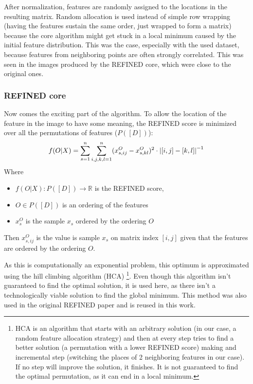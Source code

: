After normalization, features are randomly assigned to the locations in the resulting matrix. Random allocation is used instead of simple row wrapping (having the features sustain the same order, just wrapped to form a matrix) because the core algorithm might get stuck in a local minimum caused by the initial feature distribution. This was the case, especially with the used dataset, because features from neighboring points are often strongly correlated. This was seen in the images produced by the REFINED core, which were close to the original ones.

\subsubsection{REFINED core}
\label{REFINED_core}
Now comes the exciting part of the algorithm.  To allow the location of the feature in the image to have some meaning, the REFINED score is minimized over all the permutations of features ($P([D])$): 
    $$ f(O|X) = \sum_{s=1}^{n} \sum_{i, j, k, l =1}^n (x^O_{s, ij} - x^O_{s, kl})^2 \cdot \left|{[i,j] - [k,l]}\right|^{-1}$$
Where
\begin{itemize}
    \item $f(O|X): P([D]) \rightarrow \mathbb{R}$ is the REFINED score,
    \item $O \in P([D])$ is an ordering of the features
    \item $x^O_s$ is the sample $x_s$ ordered by the ordering $O$
\end{itemize}
Then $x^O_{s, ij}$ is the value is sample $x_s$ on matrix index $[i,j]$ given that the features are ordered by the ordering $O$.

As this is computationally an exponential problem, this optimum is approximated using the hill climbing algorithm (HCA) \footnote{\label{hca_description}HCA is an algorithm that starts with an arbitrary solution (in our case, a random feature allocation strategy) and then at every step tries to find a better solution (a permutation with a lower REFINED score) making and incremental step (switching the places of 2 neighboring features in our case). If no step will improve the solution, it finishes. It is not guaranteed to find the optimal permutation, as it can end in a local minimum.}. Even though this algorithm isn't guaranteed to find the optimal solution, it is used here, as there isn't a technologically viable solution to find the global minimum. This method was also used in the original REFINED paper and is reused in this work.

